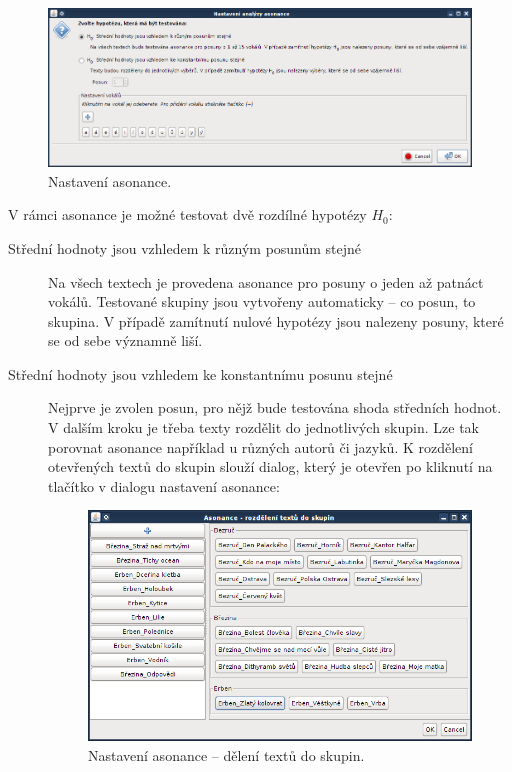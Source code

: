 \documentclass[dp.tex]{subfiles}
\begin{document}
\begin{figure}[H]
\centering
\includegraphics[max width=\textwidth,keepaspectratio=true]{imgs-60-aplikace/gui-asonance-settings}
\caption{Nastavení asonance.}
\label{fig:gui-asonance-settings}
\end{figure}

V rámci asonance je možné testovat dvě rozdílné hypotézy $H_0$:
\begin{description}
\item[Střední hodnoty jsou vzhledem k různým posunům stejné] Na všech textech je provedena asonance pro posuny o jeden až patnáct vokálů. Testované skupiny jsou vytvořeny automaticky -- co posun, to skupina. V případě zamítnutí nulové hypotézy jsou nalezeny posuny, které se od sebe významně liší. 

\item[Střední hodnoty jsou vzhledem ke konstantnímu posunu stejné] Nejprve je zvolen posun, pro nějž bude testována shoda středních hodnot. V dalším kroku je třeba texty rozdělit do jednotlivých skupin. Lze tak porovnat asonance například u různých autorů či jazyků. K rozdělení otevřených textů do skupin slouží dialog, který je otevřen po kliknutí na tlačítko  v dialogu nastavení asonance:
\begin{figure}[H]
\centering
\includegraphics[max width=\textwidth,keepaspectratio=true]{imgs-60-aplikace/gui-asonance-settings-groups}
\caption{Nastavení asonance -- dělení textů do skupin.}
\label{fig:gui-asonance-settings-groups}
\end{figure}

\end{description}
\end{document}
